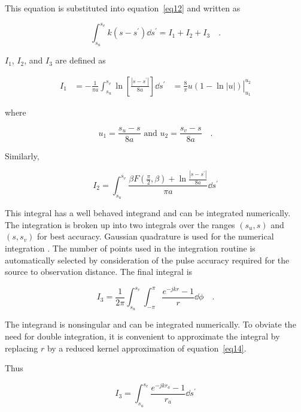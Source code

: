 \documentclass[12pt]{article}
\begin{document}
This equation is substituted into equation~\eqref{eq12} and written as

\begin{equation}
\int_{s_u}^{s_v} k(s-s^\prime)\dd{s^\prime} = I_1 + I_2 + I_3
\quad.
\label{eq20}
\end{equation}

$I_1$, $I_2$, and $I_3$ are defined as

\begin{equation}
\begin{aligned}
I_1 & = -\frac{1}{\pi a}\int_{s_u}^{s_v}
        \ln\left[\frac{|s-s^\prime|}{8a}\right] \dd{s^\prime}
    & = \left.\frac{8}{\pi} u(1-\ln|u|)\right|_{u_1}^{u_2}
\end{aligned}
\label{eq21}
\end{equation}

where

\[ u_1 = \frac{s_u - s}{8a} \mbox{ and } u_2 = \frac{s_v - s}{8a}
\quad.
\]

\noindent Similarly,

\begin{equation}
I_2 = \int_{s_u}^{s_v}
\frac{\beta F\left(\frac{\pi}{2}, \beta\right)
+ \ln\frac{|s-s^\prime|}{8a}}{\pi a}\dd{s^\prime}
\label{eq22}
\end{equation}

This integral has a well behaved integrand and can be integrated
numerically. The integration is broken up into two integrals over the
ranges $(s_u, s)$ and $(s, s_v)$ for best accuracy. Gaussian quadrature
is used for the numerical integration \cite{r7}. The number
of points used in the integration routine is automatically selected by
consideration of the pulse accuracy required for the source to
observation distance. The final integral is

\begin{equation}
I_3 = \frac{1}{2\pi}\int_{s_u}^{s_v}\int_{-\pi}^\pi\frac{e^{-jkr}-1}{r}\dd{\phi}
\quad.
\label{eq23}
\end{equation}

The integrand is nonsingular and can be integrated numerically. To
obviate the need for double integration, it is convenient to approximate
the integral by replacing $r$ by a reduced kernel approximation of
equation~\eqref{eq14}.

\noindent Thus

\begin{equation}
I_3 = \int_{s_u}^{s_v}\frac{e^{-jkr_a}-1}{r_a}\dd{s^\prime}
\label{eq24}
\end{equation}
\end{document}

